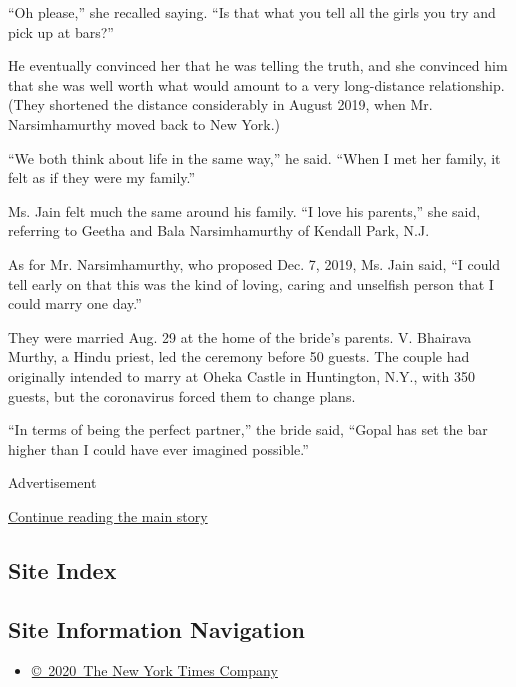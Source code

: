``Oh please,'' she recalled saying. ``Is that what you tell all the
girls you try and pick up at bars?''

He eventually convinced her that he was telling the truth, and she
convinced him that she was well worth what would amount to a very
long-distance relationship. (They shortened the distance considerably in
August 2019, when Mr. Narsimhamurthy moved back to New York.)

``We both think about life in the same way,'' he said. ``When I met her
family, it felt as if they were my family.''

Ms. Jain felt much the same around his family. ``I love his parents,''
she said, referring to Geetha and Bala Narsimhamurthy of Kendall Park,
N.J.

As for Mr. Narsimhamurthy, who proposed Dec. 7, 2019, Ms. Jain said, ``I
could tell early on that this was the kind of loving, caring and
unselfish person that I could marry one day.''

They were married Aug. 29 at the home of the bride's parents. V.
Bhairava Murthy, a Hindu priest, led the ceremony before 50 guests. The
couple had originally intended to marry at Oheka Castle in Huntington,
N.Y., with 350 guests, but the coronavirus forced them to change plans.

``In terms of being the perfect partner,'' the bride said, ``Gopal has
set the bar higher than I could have ever imagined possible.''

Advertisement

\protect\hyperlink{after-bottom}{Continue reading the main story}

\hypertarget{site-index}{%
\subsection{Site Index}\label{site-index}}

\hypertarget{site-information-navigation}{%
\subsection{Site Information
Navigation}\label{site-information-navigation}}

\begin{itemize}
\tightlist
\item
  \href{https://help.nytimes3xbfgragh.onion/hc/en-us/articles/115014792127-Copyright-notice}{©~2020~The
  New York Times Company}
\end{itemize}


